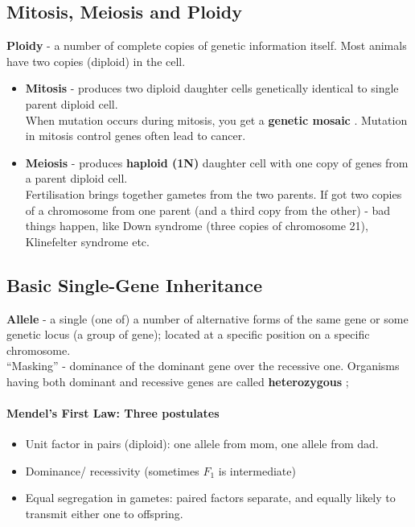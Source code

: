 \documentclass{scrartcl}
\begin{document}
\subsection{Mitosis, Meiosis and Ploidy}
\label{sec:2-4} {\bf Ploidy } - a number of complete copies of genetic information itself. Most animals have two copies (diploid) in the cell.
\begin{itemize}
\item {\bf Mitosis } - produces two diploid daughter cells genetically identical to single parent diploid cell.\\
  When mutation occurs during mitosis, you get a {\bf genetic mosaic }. Mutation in mitosis control genes often lead to cancer.
\item {\bf Meiosis} - produces {\bf haploid (1N)} daughter cell with one copy of genes from a parent diploid cell.\\
  Fertilisation brings together gametes from the two parents. If got two copies of a chromosome from one parent (and a third copy from the other) - bad things happen, like Down syndrome (three copies of chromosome 21), Klinefelter syndrome etc.
\end{itemize}
\subsection{Basic Single-Gene Inheritance}
\label{sec:2-5} {\bf Allele } - a single (one of) a number of alternative forms
of the same gene or some genetic locus (a group of gene); located at a specific
position on a
specific chromosome.\\
``Masking'' - dominance of the dominant gene over the recessive one. Organisms
having both dominant and recessive genes are called {\bf heterozygous };

\paragraph{Mendel's First Law: Three postulates}
\begin{itemize}
\item Unit factor in pairs (diploid): one allele from mom, one allele from dad.
\item Dominance/ recessivity (sometimes $F_1$ is intermediate)
\item Equal segregation in gametes: paired factors separate, and equally likely
  to transmit either one to offspring.
\end{itemize}
\end{document}
